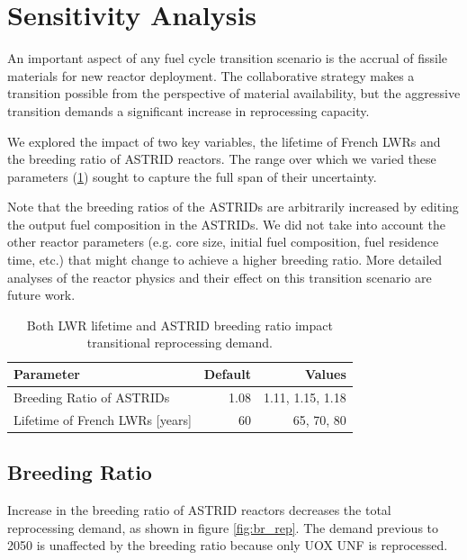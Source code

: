 \section{Sensitivity Analysis}

An important aspect of any fuel cycle transition scenario
is the accrual of fissile materials for new reactor deployment.
The collaborative strategy makes a transition possible 
from the perspective of material availability,
but the aggressive transition demands a significant increase in reprocessing capacity.

We explored the impact of two key variables, the lifetime of French \glspl{LWR} and the
breeding ratio of \gls{ASTRID} reactors. The range over which we varied these parameters (\cref{tab:sen_par})
sought to capture the full span of their uncertainty.

Note that the breeding ratios of the \glspl{ASTRID} are arbitrarily increased
by editing the output fuel composition in the \glspl{ASTRID}. We did not 
take into account the other reactor parameters (e.g. core size, initial
fuel composition, fuel residence time, etc.)
that might change to achieve a higher breeding ratio. More detailed analyses
of the reactor physics and their effect on this transition scenario are future work.


\begin{table}[h]
    \centering
    \caption{Both \gls{LWR} lifetime and \gls{ASTRID} breeding ratio impact 
    transitional reprocessing demand.}
    \begin{tabularx}{\textwidth}{lrr}
        \hline
        \textbf{Parameter} & \textbf{Default} & \textbf{Values} \\
        \hline
        Breeding Ratio of \glspl{ASTRID} & 1.08 & 1.11, 1.15, 1.18 \\ 
        Lifetime of French \glspl{LWR} [years] & 60  & 65, 70, 80 \\
        \hline
    \end{tabularx}
    \label{tab:sen_par}
\end{table}

\subsection{Breeding Ratio}


Increase in the breeding ratio of \gls{ASTRID} reactors
decreases the total reprocessing demand, as shown in 
figure \ref{fig:br_rep}.
The demand previous to 2050 is unaffected by the 
breeding ratio because only \gls{UOX} \gls{UNF} is reprocessed.

